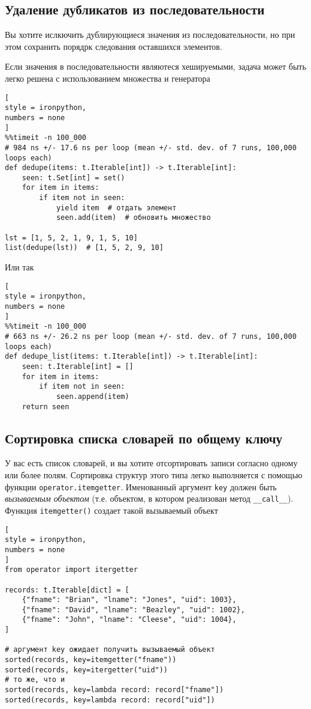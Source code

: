 \documentclass[%
	11pt,
	a4paper,
	utf8,
		]{article}
\begin{document}
\subsection{Удаление дубликатов из последовательности}

Вы хотите ислкючить дублирующиеся значения из последовательности, но при этом сохранить порядрк следования оставшихся элементов.

Если значения в последовательности являютеся хешируемыми, задача может быть легко решена с использованием множества и генератора
\begin{lstlisting}[
style = ironpython,
numbers = none
]
%%timeit -n 100_000
# 984 ns +/- 17.6 ns per loop (mean +/- std. dev. of 7 runs, 100,000 loops each)
def dedupe(items: t.Iterable[int]) -> t.Iterable[int]:
    seen: t.Set[int] = set()
    for item in items:
        if item not in seen:
            yield item  # отдать элемент
            seen.add(item)  # обновить множество
            
lst = [1, 5, 2, 1, 9, 1, 5, 10]
list(dedupe(lst))  # [1, 5, 2, 9, 10]
\end{lstlisting}

Или так
\begin{lstlisting}[
style = ironpython,
numbers = none	
]
%%timeit -n 100_000
# 663 ns +/- 26.2 ns per loop (mean +/- std. dev. of 7 runs, 100,000 loops each)
def dedupe_list(items: t.Iterable[int]) -> t.Iterable[int]:
    seen: t.Iterable[int] = []
    for item in items:
        if item not in seen:
            seen.append(item)
    return seen
\end{lstlisting}

\subsection{Сортировка списка словарей по общему ключу}

У вас есть список словарей, и вы хотите отсортировать записи согласно одному или более полям. Сортировка структур этого типа легко выполняется с помощью функции \texttt{operator.itemgetter}. Именованный аргумент \texttt{key} должен быть \emph{вызываемым объектом} (т.е. объектом, в котором реализован метод \verb|__call__|). Функция \texttt{itemgetter()} создает такой вызываемый объект
\begin{lstlisting}[
style = ironpython,
numbers = none
]
from operator import itergetter

records: t.Iterable[dict] = [
    {"fname": "Brian", "lname": "Jones", "uid": 1003},
    {"fname": "David", "lname": "Beazley", "uid": 1002},
    {"fname": "John", "lname": "Cleese", "uid": 1004},
]

# аргумент key ожидает получить вызываемый объект
sorted(records, key=itemgetter("fname"))
sorted(records, key=itergetter("uid"))
# то же, что и
sorted(records, key=lambda record: record["fname"])
sorted(records, key=lambda record: record["uid"])
\end{lstlisting}
\end{document}
